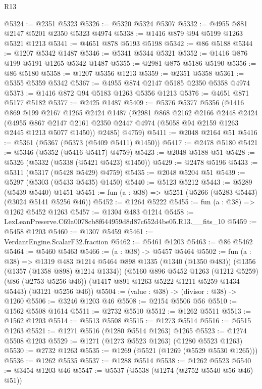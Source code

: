 \begin{lexlean}{R13}
\begin{coremodule}
@5324 := @2351 @5323
@5326 := @5320 @5324 @5307
@5332 := @4955 @881 @2147 @5201 @2350 @5323 @4974
@5338 := @1416 @879 @94 @5199 @1263 @5321 @1213
@5341 := @4651 @878 @5193 @5198
@5342 := @86 @5188
@5344 := @1207 @5342 @1487
@5346 := @5341 @5344 @5321
@5352 := @1416 @876 @199 @5191 @1265 @5342 @1487
@5355 := @2981 @875 @5186 @5190
@5356 := @86 @5180
@5358 := @1207 @5356 @1213
@5359 := @2351 @5358
@5361 := @5355 @5359 @5342
@5367 := @4955 @874 @2147 @5185 @2350 @5358 @4974
@5373 := @1416 @872 @94 @5183 @1263 @5356 @1213
@5376 := @4651 @871 @5177 @5182
@5377 := @2425 @1487
@5409 := @5376
    @5377
    @5356
    (@1416
      @869
      @199
      @2167
      @1265
      @2424
      @1487
      (@2981
        @868
        @2162
        @2166
        @2448
        @2424
        (@4955 @867 @2147 @2161 @2350 @2447 @4974 (@5058 @94 @2159 @1263 @2445 @1213 @5077 @1450))
        @2485)
      @4759)
@5411 := @2048 @2164 @51
@5416 := @5361 (@5367 (@5373 (@5409 @5411) @1450))
@5417 := @2478 @5180
@5421 := @5346 (@5352 (@5416 @5417) @4759)
@5423 := @2048 @5188 @51
@5428 := @5326 (@5332 (@5338 (@5421 @5423) @1450))
@5429 := @2478 @5196
@5433 := @5311 (@5317 (@5428 @5429) @4759)
@5435 := @2048 @5204 @51
@5439 := @5297 (@5303 (@5433 @5435) @1450)
@5440 := @5123 @5212
@5443 := @5289 (@5439 @5440) @1451
@5451 := fun (a : @38) => @5251 (@5266 (@5283 @5443) (@3024 @5141 @5256 @46))
@5452 := @1264 @5222
@5455 := fun (a : @38) => @1262 @5452 @1263
@5457 := @1304 @483 @1214
@5458 := LexLeanPreserve.C69a0078cb8f644959d8d87c652d4be05.R13.__fits_10
@5459 := @5458 @1203
@5460 := @1307 @5459
@5461 := VerdantEngine.ScalarF32.fraction
@5462 := @5461 @1203
@5463 := @86 @5462
@5464 := @5460 @5463
@5466 := (a : @38) -> @5457 @5464
@5502 := fun (a : @38) =>
  @1319
    @483
    @1214
    @5464
    @898
    @1335
    (@1340 (@1350 @483))
    (@1356 (@1357 (@1358 @898) @1214 @1334))
    (@5160
      @896
      @5452
      @1263
      (@1212 @5259)
      (@86 (@2753 @5256 @46))
      (@1417 @891 @1263 @5222 @1211 @5259 @1434 @5443)
      (@3121 @5256 @46))
@5504 := (value : @38) -> (divisor : @38) -> @1260
@5506 := @3246 @1203 @46
@5508 := @2154 @5506 @56
@5510 := @1562 @5508 @1614
@5511 := @2732 @5510
@5512 := @1262 @5511
@5513 := @1562 @1203
@5514 := @5513 @5508
@5515 := @1273 @5514
@5516 := @5515 @1263
@5521 := @1271 @5516 (@1280 @5514 @1263) @1265
@5523 := @1274 @5508 @1203
@5529 := @1271 (@1273 @5523 @1263) (@1280 @5523 @1263)
@5530 := @2732 @1263
@5535 := @1269 (@5521 (@1269 (@5529 @5530 @1265)))
@5536 := @1262 @5535
@5537 := @1288 @5514
@5538 := @1262 @5523
@5540 := @3454 @1203 @46
@5547 := @5537 (@5538 (@1274 (@2752 @5540 @56 @46) @51))

\end{coremodule}
\end{lexlean}
